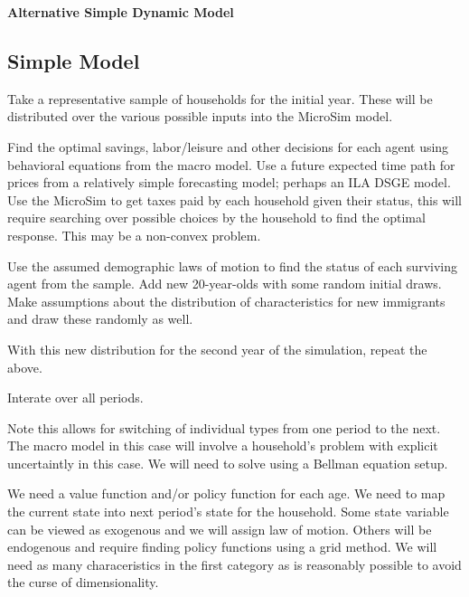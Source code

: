 \documentclass[letterpaper,12pt]{article}
\begin{document}
\begin{center}
{\LARGE \bf Alternative Simple Dynamic Model}
\end{center}

\begin{spacing}{1.5}

\section{Simple Model}

	Take a representative sample of households for the initial year.  These will be distributed over the various possible inputs into the MicroSim model.

	Find the optimal savings, labor/leisure and other decisions for each agent using behavioral equations from the macro model.  Use a future expected time path for prices from a relatively simple forecasting model; perhaps an ILA DSGE model.  Use the MicroSim to get taxes paid by each household given their status, this will require searching over possible choices by the household to find the optimal response.  This may be a non-convex problem.

	Use the assumed demographic laws of motion to find the status of each surviving agent from the sample.  Add new 20-year-olds with some random initial draws.  Make assumptions about the distribution of characteristics for new immigrants and draw these randomly as well.

	With this new distribution for the second year of the simulation, repeat the above.

	Interate over all periods.

	Note this allows for switching of individual types from one period to the next.  The macro model in this case will involve a household's problem with explicit uncertaintly in this case.  We will need to solve using a Bellman equation setup.

	We need a value function and/or policy function for each age.  We need to map the current state into next period's state for the household.  Some state variable can be viewed as exogenous and we will assign law of motion.  Others will be endogenous and require finding policy functions using a grid method.  We will need as many characeristics in the first category as is reasonably possible to avoid the curse of dimensionality.

\end{spacing}
\end{document}
